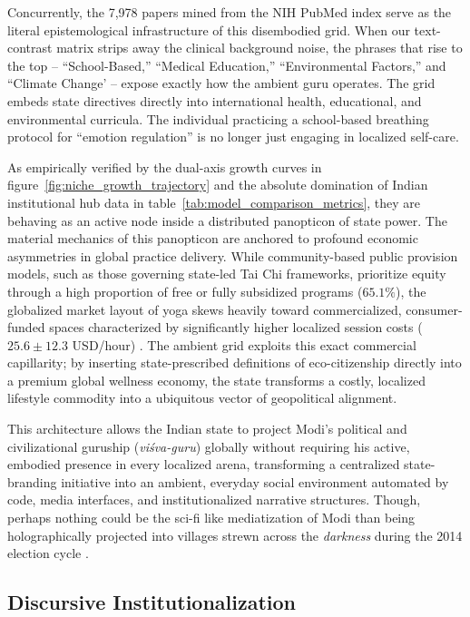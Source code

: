 \documentclass[11pt]{article}
\begin{document}
Concurrently, the 7,978 papers mined from the NIH PubMed index serve as the literal epistemological infrastructure of this disembodied grid. When our text-contrast matrix strips away the clinical background noise, the phrases that rise to the top -- ``School-Based,'' ``Medical Education,'' ``Environmental Factors,'' and ``Climate Change' -- expose exactly how the ambient guru operates. The grid embeds state directives directly into international health, educational, and environmental curricula. The individual practicing a school-based breathing protocol for ``emotion regulation'' is no longer just engaging in localized self-care. 

As empirically verified by the dual-axis growth curves in figure~\ref{fig:niche_growth_trajectory} and the absolute domination of Indian institutional hub data in table~\ref{tab:model_comparison_metrics}, they are behaving as an active node inside a distributed panopticon of state power. The material mechanics of this panopticon are anchored to profound economic asymmetries in global practice delivery. While community-based public provision models, such as those governing state-led Tai Chi frameworks, prioritize equity through a high proportion of free or fully subsidized programs ($65.1\%$), the globalized market layout of yoga skews heavily toward commercialized, consumer-funded spaces characterized by significantly higher localized session costs ($25.6 \pm 12.3$ USD/hour) \cite{zhou2026yoga}. The ambient grid exploits this exact commercial capillarity; by inserting state-prescribed definitions of eco-citizenship directly into a premium global wellness economy, the state transforms a costly, localized lifestyle commodity into a ubiquitous vector of geopolitical alignment.

 This architecture allows the Indian state to project Modi’s political and civilizational guruship (\textit{vi\'{s}va-guru}) globally without requiring his active, embodied presence in every localized arena, transforming a centralized state-branding initiative into an ambient, everyday social environment automated by code, media interfaces, and institutionalized narrative structures. Though, perhaps nothing could be the sci-fi like mediatization of Modi than being holographically projected into villages strewn across the \textit{darkness} during the 2014 election cycle \cite{deshgujarat2013modi,deb2024twilight}.


\subsection{Discursive Institutionalization}
\end{document}
